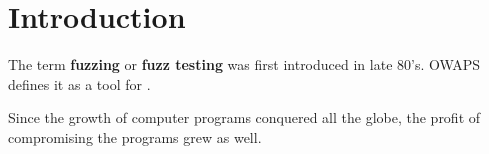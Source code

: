\section{Introduction}

The term \textbf{fuzzing} or \textbf{fuzz testing} was first introduced in late 80's. OWAPS defines it as a tool for . \cite{owasp}

Since the growth of computer programs conquered all the globe, the profit of compromising the programs grew as well. 